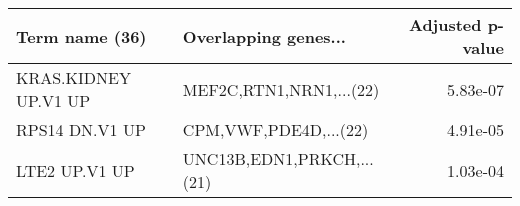 \begin{tabular}{llr}
\toprule
      Term name (36) &      Overlapping genes... &  Adjusted p-value \\
\midrule
KRAS.KIDNEY UP.V1 UP &   MEF2C,RTN1,NRN1,...(22) &          5.83e-07 \\
      RPS14 DN.V1 UP &     CPM,VWF,PDE4D,...(22) &          4.91e-05 \\
       LTE2 UP.V1 UP & UNC13B,EDN1,PRKCH,...(21) &          1.03e-04 \\
\bottomrule
\end{tabular}
